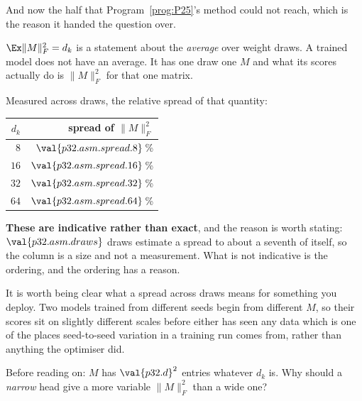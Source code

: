 \begin{fr}
And now the half that Program~\ref{prog:P25}'s method could not reach, which
is the reason it handed the question over.

$\Ex\lVert M\rVert_F^{2} = d_k$ is a statement about the \emph{average} over
weight draws. A trained model does not have an average. It has one draw
\dash{} one $M$ \dash{} and what its scores actually do is
$\lVert M\rVert_F^{2}$ for that one matrix.

Measured across draws, the relative spread of that quantity:

\begin{center}
\begin{tabular}{rr}
\toprule
$d_k$ & spread of $\lVert M\rVert_F^{2}$ \\
\midrule
$8$  & $\val{p32.asm.spread.8}$\,\% \\
$16$ & $\val{p32.asm.spread.16}$\,\% \\
$32$ & $\val{p32.asm.spread.32}$\,\% \\
$64$ & $\val{p32.asm.spread.64}$\,\% \\
\bottomrule
\end{tabular}
\end{center}

\textbf{These are indicative rather than exact}, and the reason is worth
stating: $\val{p32.asm.draws}$ draws estimate a spread to about a seventh of
itself, so the column is a size and not a measurement. What is not
indicative is the ordering, and the ordering has a reason.

It is worth being clear what a spread across draws means for something you
deploy. Two models trained from different seeds begin from different $M$, so
their scores sit on slightly different scales before either has seen any
data \dash{} which is one of the places seed-to-seed variation in a training
run comes from, rather than anything the optimiser did.

Before reading on: $M$ has $\val{p32.d}^{2}$ entries whatever $d_k$ is. Why
should a \emph{narrow} head give a more variable $\lVert M\rVert_F^{2}$ than
a wide one?
\dotline
\nextframe
\end{fr}

